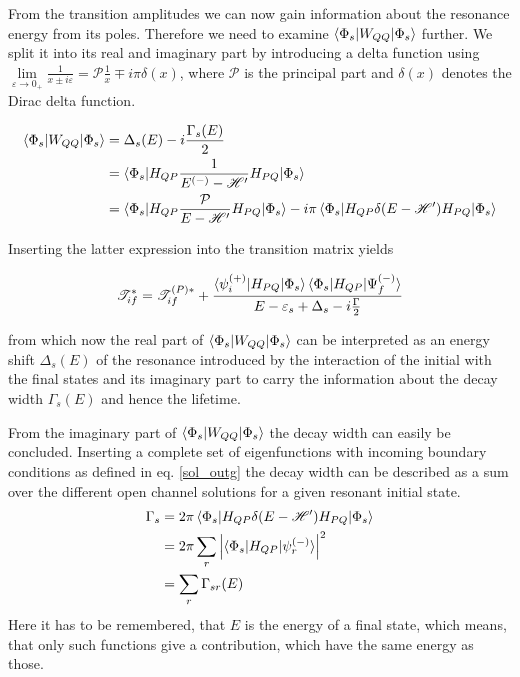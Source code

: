 From the transition amplitudes we can now gain information about
the resonance energy from its poles. Therefore we need to examine
$\braket{\Phi_s|W_{QQ}|\Phi_s}$ further.
We split it into
its real and imaginary part by introducing a delta function using 
$\lim\limits_{\varepsilon \to 0_+} \frac{1}{x \pm i\varepsilon}
 = \mathscr{P} \frac 1x \mp i\pi\delta(x)$,
where $\mathscr{P}$ is the principal part and $\delta(x)$ denotes the
Dirac delta function. \cite{Cohen-Tannoudji_3_2}

\begin{align}
  \braket{\Phi_s|W_{QQ}|\Phi_s} & = \Delta_s(E) - i \frac{\Gamma_s(E)}{2}\\
                                & = \braket{\Phi_s|H_{QP}
                                    \frac{1}{E^{(-)} - \mathscr{H}'}H_{PQ}|\Phi_s}\\
                                & = \braket{\Phi_s|H_{QP}
                                    \frac{\mathcal{P}}{E - \mathscr{H}'}H_{PQ}|\Phi_s}
                                    - i\pi \braket{\Phi_s|H_{QP}\delta(E-\mathscr{H}')H_{PQ}
                                    |\Phi_s} 
\end{align}

Inserting the latter expression into the transition matrix yields

\begin{equation}
  \mathscr{T}_{if}^* = \mathscr{T}_{if}^{(P)*} + 
                     \frac{\braket{\psi_i^{(+)}|H_{PQ}|\Phi_s}
                           \braket{\Phi_s|H_{QP}|\Psi_f^{(-)}}}
                          {E-\varepsilon_s + \Delta_s - i \frac{\Gamma}{2}}
\end{equation}

from which now the real part of $\braket{\Phi_s|W_{QQ}|\Phi_s}$ can be interpreted 
as an energy shift $\Delta_s(E)$ of the resonance introduced by the interaction of the initial
with the final states and its imaginary part to carry the information about the
decay width $\Gamma_s(E)$ and hence the lifetime.


From the imaginary part of $\braket{\Phi_s|W_{QQ}|\Phi_s}$ the decay width can
easily be concluded. Inserting a complete set
of eigenfunctions with incoming boundary conditions as defined in
eq. \ref{sol_outg} the decay width can be described
as a sum over the different open channel solutions for a given resonant initial state.
\begin{align}
  \Gamma_s & = 2 \pi \braket{\Phi_s|H_{QP}\delta(E - \mathscr{H}')H_{PQ}|\Phi_s}
               \label{equation:Gamma_HE}\\
           & = 2 \pi \sum\limits_r \left | \braket{\Phi_s|H_{QP}|\psi_r^{(-)}} \right|^2
                 \label{equation:Gamma_HQP}\\
           & = \sum\limits_r \Gamma_{sr}(E)
\end{align}
Here it has to be remembered, that $E$ is the energy of a final state, which means, that
only such functions give a contribution, which have the same energy as those.

